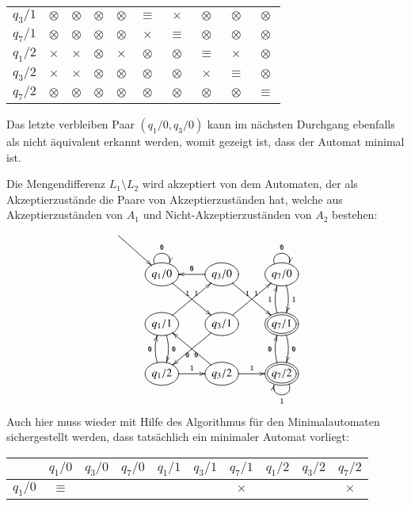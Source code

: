 \begin{loesung}
\begin{teilaufgaben}
\begin{center}
\begin{tabular}{|c|ccccccccc|}
$q_3/1$  &$\otimes$&$\otimes$&$\otimes$&$\otimes$&$\equiv$ &$\times$ &$\otimes$&$\otimes$&$\otimes$\\
$q_7/1$  &$\otimes$&$\otimes$&$\otimes$&$\otimes$&$\times$ &$\equiv$ &$\otimes$&$\otimes$&$\otimes$\\
$q_1/2$  &$\times$ &$\times$ &$\otimes$&$\times$ &$\otimes$&$\otimes$&$\equiv$ &$\times$ &$\otimes$\\
$q_3/2$  &$\times$ &$\times$ &$\otimes$&$\otimes$&$\otimes$&$\otimes$&$\times$ &$\equiv$ &$\otimes$\\
$q_7/2$  &$\otimes$&$\otimes$&$\otimes$&$\otimes$&$\otimes$&$\otimes$&$\otimes$&$\otimes$&$\equiv$ \\
\hline
\end{tabular}
\end{center}
Das letzte verbleiben Paar $(q_1/0,q_3/0)$ kann im nächsten Durchgang ebenfalls als
nicht äquivalent erkannt werden, womit gezeigt ist, dass der Automat
minimal ist.
\item
Die Mengendifferenz $L_1\setminus L_2$ wird akzeptiert von dem Automaten,
der als Akzeptierzustände die Paare von Akzeptierzuständen hat, welche
aus Akzeptierzuständen von $A_1$ und Nicht-Akzeptierzuständen von $A_2$
bestehen:
\[
\entrymodifiers={++[o][F]}
\xymatrix{
*+\txt{}\ar[dr]
\\
*+\txt{}
        &{q_1/0} \ar@(ul,ur)^{\tt 0} \ar[dr]^{\tt 1}
                &{q_3/0} \ar[l]_{\tt 0} \ar[dr]^{\tt 1}
                        &{q_7/0} \ar@(ul,ur)^{\tt 0} \ar@/^/[d]^{\tt 1}
\\
*+\txt{}
        &{q_1/1} \ar@/^/[d]^{\tt 0} \ar[ur]^{\tt 1}
                &{q_3/1} \ar[dl]^{\tt 0} \ar[ur]^{\tt 1}
                        &*++[o][F=]{q_7/1} \ar@/^/[d]^{\tt 0} \ar@/^/[u]^{\tt 1}
\\
*+\txt{}
        &{q_1/2} \ar@/^/[u]^{\tt 0} \ar[r]^{\tt 1}
                &{q_3/2} \ar[ul]^{\tt 0} \ar[r]^{\tt 1}
                        &*++[o][F=]{q_7/2} \ar@/^/[u]^{\tt 0} \ar@(dr,dl)^{\tt 1}
\\
}
\]
Auch hier muss wieder mit Hilfe des Algorithmus für den Minimalautomaten
sichergestellt werden, dass tatsächlich ein minimaler Automat vorliegt:
\begin{center}
\begin{tabular}{|c|ccccccccc|}
\hline
         &$q_1/0$  &$q_3/0$  &$q_7/0$  &$q_1/1$  &$q_3/1$  &$q_7/1$  &$q_1/2$  &$q_3/2$  &$q_7/2$  \\
\hline
$q_1/0$  &$\equiv$ &         &         &         &         &$\times$ &         &         &$\times$ \\

\end{tabular}
\end{center}
\end{teilaufgaben}
\end{loesung}
